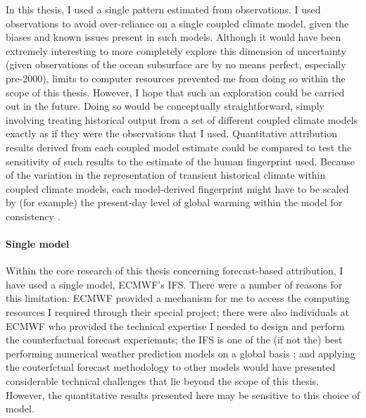     In this thesis, I used a single pattern estimated from observations. I used observations to avoid over-reliance on a single coupled climate model, given the biases and known issues present in such models. Although it would have been extremely interesting to more completely explore this dimension of uncertainty (given observations of the ocean subsurface are by no means perfect, especially pre-2000), limits to computer resources prevented me from doing so within the scope of this thesis. However, I hope that such an exploration could be carried out in the future. Doing so would be conceptually straightforward, simply involving treating historical output from a set of different coupled climate models exactly as if they were the observations that I used. Quantitative attribution results derived from each coupled model estimate could be compared to test the sensitivity of such results to the estimate of the human fingerprint used. Because of the variation in the representation of transient historical climate within coupled climate models, each model-derived fingerprint might have to be scaled by (for example) the present-day level of global warming within the model for consistency \citep{tokarska_past_2020}.

  \paragraph*{Single model}

    Within the core research of this thesis concerning forecast-based attribution, I have used a single model, ECMWF's IFS. There were a number of reasons for this limitation: ECMWF provided a mechanism for me to access the computing resources I required through their special project; there were also individuals at ECMWF who provided the technical expertise I needed to design and perform the counterfactual forecast experiemnts; the IFS is one of the (if not the) best performing numerical weather prediction models on a global basis \citep{hagedorn_comparing_2012}; and applying the couterfctual forecast methodology to other models would have presented considerable technical challenges that lie beyond the scope of this thesis. However, the quantitative results presented here may be sensitive to this choice of model. 
    

